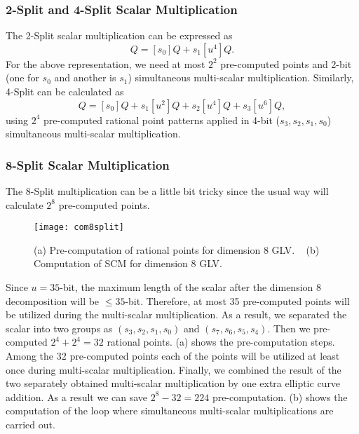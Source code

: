 \subsubsection{2-Split and 4-Split Scalar Multiplication}
The 2-Split scalar multiplication can be expressed as
\begin{equation}
    [s]Q = [s_0]Q + s_1 [u^4]Q.
\end{equation}
For the above representation, we need at most $2^2$ pre-computed points and 2-bit (one for $s_0$ and another is $s_1$) simultaneous multi-scalar multiplication.
Similarly, 4-Split can be calculated as 
\begin{equation}
    [s]Q = [s_0]Q+s_1[u^2]Q+s_2[u^4]Q+s_3[u^6]Q,
\end{equation}
using $2^4$ pre-computed rational point patterns applied in 4-bit ($s_3,s_2,s_1,s_0$) simultaneous multi-scalar multiplication. 

\subsubsection{8-Split Scalar Multiplication}
The 8-Split multiplication can be a little bit tricky since the usual way will calculate $2^8$ pre-computed points.
\begin{figure*}
\centering
	\texttt{[image: com8split]}
\caption{(a) Pre-computation of rational points for dimension 8  GLV. ~ (b) Computation of SCM for dimension 8  GLV.}
\label{precom_figure}
\end{figure*}
 Since $u = 35$-bit,  the maximum length of the scalar after the dimension 8 decomposition will be $\leq 35$-bit.
Therefore, at most 35 pre-computed points will be utilized during the  multi-scalar multiplication.
As a result, we separated the scalar into two groups as $(s_3,s_2,s_1,s_0)$ and $(s_7,s_6,s_5,s_4)$.
Then we pre-computed $2^4 + 2^4 = 32$ rational points.
(a) shows the pre-computation steps.  
Among the 32 pre-computed points each of the points will be utilized at least once during multi-scalar multiplication. 
Finally, we combined the result of the two separately  obtained multi-scalar multiplication by one extra elliptic curve addition. 
As a result we can save $2^8-32 = 224$ pre-computation. 
(b) shows the computation of the loop where simultaneous multi-scalar multiplications are carried out. 

